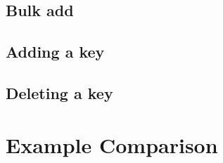 \documentclass[12pt]{article}
\begin{document}
\subsection{Bulk add}

\subsection{Adding a key}

\subsection{Deleting a key}

\section{Example Comparison}
\end{document}
